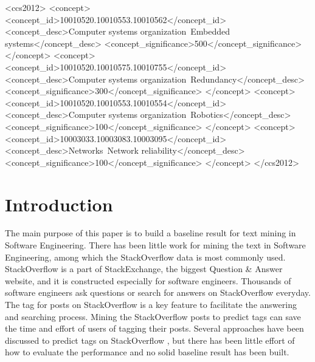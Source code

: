 \documentclass{sig-alternate-05-2015}
\begin{document}
%
%
\begin{CCSXML}
<ccs2012>
 <concept>
  <concept_id>10010520.10010553.10010562</concept_id>
  <concept_desc>Computer systems organization~Embedded systems</concept_desc>
  <concept_significance>500</concept_significance>
 </concept>
 <concept>
  <concept_id>10010520.10010575.10010755</concept_id>
  <concept_desc>Computer systems organization~Redundancy</concept_desc>
  <concept_significance>300</concept_significance>
 </concept>
 <concept>
  <concept_id>10010520.10010553.10010554</concept_id>
  <concept_desc>Computer systems organization~Robotics</concept_desc>
  <concept_significance>100</concept_significance>
 </concept>
 <concept>
  <concept_id>10003033.10003083.10003095</concept_id>
  <concept_desc>Networks~Network reliability</concept_desc>
  <concept_significance>100</concept_significance>
 </concept>
</ccs2012>  
\end{CCSXML}



%
%

%
%
\printccsdesc



\section{Introduction}

The main purpose of this paper is to build a baseline result for text mining in Software Engineering. There has been little work for mining the text in Software Engineering, among which the StackOverflow data is most commonly used. StackOverflow is a part of StackExchange, the biggest Question \& Answer website, and it is constructed especially for software engineers. Thousands of software engineers ask questions or search for answers on StackOverflow everyday. The tag for posts on StackOverflow is a key feature to facilitate the answering and searching process. Mining the StackOverflow posts to predict tags can save the time and effort of users of tagging their posts. Several approaches have been discussed to predict tags on StackOverflow \cite{stanley2013predicting,moharanatag,kuo2011word}, but there has been little effort of how to evaluate the performance and no solid baseline result has been built.
\end{document}
